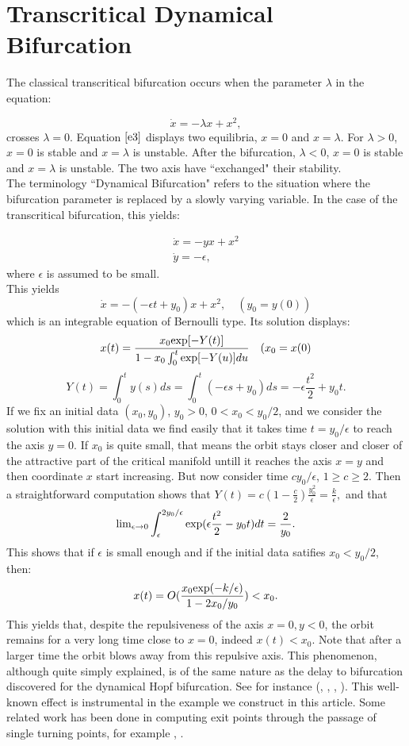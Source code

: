 \documentclass[12pt,psamsfonts]{amsart}
\begin{document}
\section{Transcritical Dynamical Bifurcation}

The classical transcritical bifurcation occurs when the parameter $\lambda$
in the equation:

\begin{equation}
\label{e3}
\dot{x}=-{\lambda}x+x^2,
\end{equation}
crosses $\lambda=0$. Equation $\ref{e3}$ displays two equilibria, $x=0$
and $x=\lambda$. For $\lambda>0$, $x=0$ is stable and $x=\lambda$
is unstable. After the bifurcation, $\lambda<0$, $x=0$ is stable
and $x=\lambda$ is unstable. The two axis have ``exchanged" their
stability.\\
The terminology ``Dynamical Bifurcation" refers to the situation
where the bifurcation parameter is replaced by a slowly varying
variable. In the case of the transcritical bifurcation, this
yields:

\begin{eqnarray}
\label{e4}
\dot{x}=-yx+x^2\\
\dot{y}=-\epsilon,
\end{eqnarray}
where $\epsilon$ is assumed to be small.\\
This yields
$$\dot{x}=-(-{\epsilon}t+y_0)x+x^2, \quad (y_0=y(0))$$
which is an integrable equation of Bernoulli type. Its solution
displays:
$$x(t)=\frac{x_0{\rm exp}[-Y(t)]}{1-x_0\int_0^t {\rm exp}[-Y(u)]du} \quad (x_0=x(0)$$
$$Y(t)=\int_0^t y(s)ds=\int_0^t (-{\epsilon}s+y_0)ds=-{\epsilon}\frac{t^2}{2}+y_0 t.$$
If we fix an initial data $(x_0,y_0)$, $y_0>0$, $0<x_0<y_0/2$, and we consider
the solution with this initial data we find easily that it takes
time $t=y_0/{\epsilon}$ to reach the axis $y=0$. If $x_0$ is quite
small, that means the orbit stays closer and closer of the
attractive part of the critical manifold untill it reaches the axis $x=y$ and then
coordinate $x$ start increasing. But now consider time
$cy_0/{\epsilon}$, $1\geq c\geq 2$. Then a straightforward computation shows that
$Y(t)=c(1-\frac{c}{2})\frac{y_0^2}{\epsilon}
=\frac{k}{\epsilon},$ and that
$${\rm lim}_{\epsilon\to 0} \int_{\epsilon}^{2y_0/{\epsilon}}{\rm exp}
(\epsilon\frac{t^2}{2}-y_0 t)dt=\frac{2}{y_0}.$$
This shows that if $\epsilon$ is small enough and if the initial
data satifies $x_0<y_0/2$, then:
$$x(t)=O(\frac{x_0{\rm exp}(-k/{\epsilon})}{1-2x_0/y_0})<x_0.$$
This yields that, despite the repulsiveness of the axis $x=0, y<0$,
the orbit remains for a very long time close to $x=0$, indeed
$x(t)<x_0$. Note that after a larger time the orbit blows away
from this repulsive axis. This phenomenon, although quite simply
explained, is of the same nature as the delay to bifurcation
discovered for the dynamical Hopf bifurcation. See for instance
(\cite{ErnBaRinz}, \cite{CDD}, \cite{Ern}, \cite{Z}).
This well-known effect is
instrumental in the example we construct in this article. Some
related work has been done in computing exit points through the
passage of single turning points, for example \cite{Ben},
\cite{DeDu}.
\end{document}
